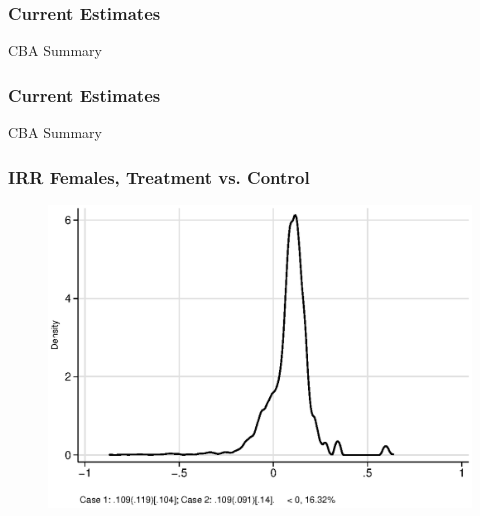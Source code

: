 \documentclass[static]{JJH-Beamer}
\begin{document}

\begin{frame}
\frametitle{Current Estimates}
\begin{center}
\begin{table}
	\caption{CBA Summary}
	\scalebox{.60}{}
\end{table}
\end{center}
\end{frame}


\begin{frame}
\frametitle{Current Estimates}
\begin{center}
\begin{table}
	\caption{CBA Summary}
	\scalebox{.40}{}
\end{table}
\end{center}
\end{frame}


\begin{frame}
\frametitle{IRR Females, Treatment vs. Control} 
\begin{figure}
	\includegraphics[width=.8\columnwidth]{output/irr_2_sexf.eps}
\end{figure}
\end{frame}

\end{document}
